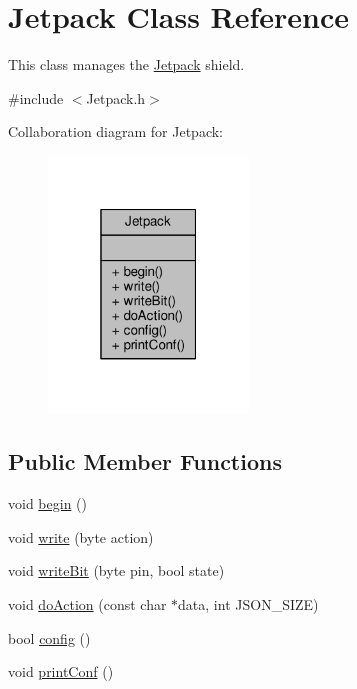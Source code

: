 \hypertarget{class_jetpack}{}\section{Jetpack Class Reference}
\label{class_jetpack}


This class manages the \hyperlink{class_jetpack}{Jetpack} shield.  




{\ttfamily \#include $<$Jetpack.\+h$>$}



Collaboration diagram for Jetpack\+:
\nopagebreak
\begin{figure}[H]
\begin{center}
\leavevmode
\includegraphics[width=151pt]{da/db7/class_jetpack__coll__graph}
\end{center}
\end{figure}
\subsection*{Public Member Functions}
\begin{DoxyCompactItemize}
\item 
void \hyperlink{class_jetpack_a5a53e1ebf7aaf3bf3e0d37ea64ca09a7}{begin} ()
\item 
void \hyperlink{class_jetpack_a338f1af8cbc6504ac69b47c7328569b5}{write} (byte action)
\item 
void \hyperlink{class_jetpack_a79ae7bc3c1828a0551a7c005c4f8bd00}{write\+Bit} (byte pin, bool state)
\item 
void \hyperlink{class_jetpack_a86d2e83436ef4b85f4c3a6e85ac785b0}{do\+Action} (const char $\ast$data, int J\+S\+O\+N\+\_\+\+S\+I\+ZE)
\item 
bool \hyperlink{class_jetpack_ab065ee83e244265a2223a22f3ee4a719}{config} ()
\item 
void \hyperlink{class_jetpack_ac54a7bb4f9166bee32052253d9b1d306}{print\+Conf} ()
\end{DoxyCompactItemize}


